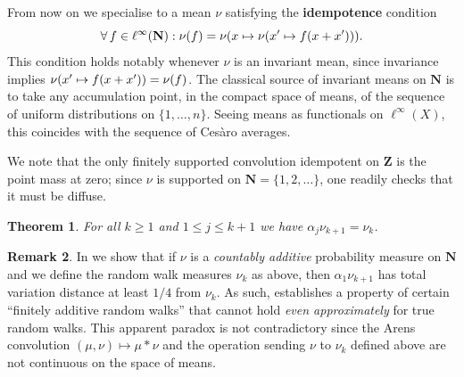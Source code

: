 \documentclass[12pt, pdflatex]{amsart}
\newtheorem{theorem}{Theorem}
\theoremstyle{definition}
\newtheorem{remark}[theorem]{Remark}
\numberwithin{equation}{section}
\numberwithin{theorem}{section}
\newcommand{\NN}{\mathbf{N}}
\newcommand{\ZZ}{\mathbf{Z}}
\begin{document}
\bigskip

From now on we specialise to a mean $\nu$ satisfying the \textbf{idempotence} condition
\begin{equation}\label{eq:idem}
\forall \, f\in\ell^\infty(\NN) : \nu(f) = \nu \mleft( x \mapsto \nu\mleft(x'\mapsto f(x+x') \mright) \mright).
\end{equation}
This condition holds notably whenever $\nu$ is an invariant mean, since invariance implies $\nu\mleft(x'\mapsto f(x+x') \mright) = \nu(f)$. The classical source of invariant means on $\NN$ is to take any accumulation point, in the compact space of means, of the sequence of uniform distributions on $\{1, \ldots, n\}$. Seeing means as functionals on $\ell^\infty(X)$, this coincides with the sequence of Ces{\`a}ro averages.

We note that the only finitely supported convolution idempotent on $\ZZ$ is the point mass at zero; since $\nu$ is supported on $\NN=\{1,2,\ldots\}$, one readily checks that it must be diffuse.

\begin{theorem}\label{thm:omega-invariant}
For all $k\geq 1$ and  $1\leq j \leq k+1$ we have $\alpha_j \nu_{k+1} = \nu_{k}$.
\end{theorem}

\begin{remark}
In  we show that if $\nu$ is a \textit{countably additive} probability measure on $\NN$ and we define the random walk measures $\nu_k$ as above, then $\alpha_1\nu_{k+1}$ has total variation distance at least $1/4$ from $\nu_k$. As such,  establishes a property of certain ``finitely additive random walks'' that cannot hold \emph{even approximately} for true random walks. This apparent paradox is not contradictory since the Arens convolution $(\mu,\nu)\mapsto \mu*\nu$ and the operation sending $\nu$ to $\nu_k$ defined above are not continuous  on the space of means.
\end{remark}
\end{document}
